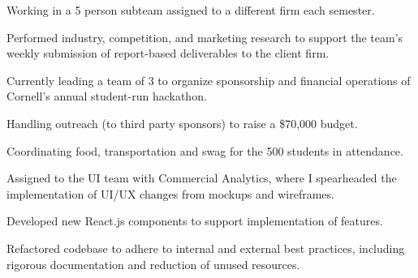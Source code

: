 \documentclass[]{deedy-resume-openfont}
\begin{document}
\begin{minipage}[t]{0.66\textwidth}
\vspace{\topsep} %
\begin{tightemize}
\item Working in a 5 person subteam assigned to a different firm each semester.
\item Performed industry, competition, and marketing research to support the team's weekly submission of report-based deliverables to the client firm.
\end{tightemize}
\sectionsep
{}
\begin{tightemize}
\item Currently leading a team of 3 to organize sponsorship and financial operations of Cornell's annual student-run hackathon.
\item Handling outreach (to third party sponsors) to raise a \$70,000 budget.
\item Coordinating food, transportation and swag for the 500 students in attendance.
\end{tightemize}
\sectionsep

\begin{tightemize}
\item Assigned to the UI team with Commercial Analytics, where I spearheaded the implementation of UI/UX changes from mockups and wireframes.
\item Developed new React.js components to support implementation of features.
\item Refactored codebase to adhere to internal and external best practices, including rigorous documentation and reduction of unused resources.
\end{tightemize}
\sectionsep









\end{minipage}
\end{document}
